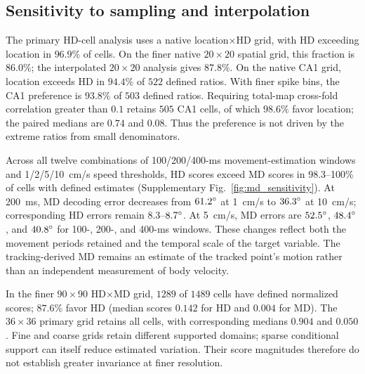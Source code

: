 \documentclass[11pt]{article}
\begin{document}
\subsection*{Sensitivity to sampling and interpolation}
The primary HD-cell analysis uses a native location$\times$HD grid, with HD exceeding location in $96.9\%$ of cells. On the finer native $20\times20$ spatial grid, this fraction is $86.0\%$; the interpolated $20\times20$ analysis gives $87.8\%$. On the native CA1 grid, location exceeds HD in $94.4\%$ of $522$ defined ratios. With finer spike bins, the CA1 preference is $93.8\%$ of $503$ defined ratios. Requiring total-map cross-fold correlation greater than $0.1$ retains $505$ CA1 cells, of which $98.6\%$ favor location; the paired medians are $0.74$ and $0.08$. Thus the preference is not driven by the extreme ratios from small denominators.

Across all twelve combinations of 100/200/400-ms movement-estimation windows and 1/2/5/10~cm/s speed thresholds, HD scores exceed MD scores in 98.3--100\% of cells with defined estimates (Supplementary Fig.~\ref{fig:md_sensitivity}). At 200~ms, MD decoding error decreases from $61.2\degree$ at 1~cm/s to $36.3\degree$ at 10~cm/s; corresponding HD errors remain $8.3$--$8.7\degree$. At 5~cm/s, MD errors are $52.5\degree$, $48.4\degree$, and $40.8\degree$ for 100-, 200-, and 400-ms windows. These changes reflect both the movement periods retained and the temporal scale of the target variable. The tracking-derived MD remains an estimate of the tracked point's motion rather than an independent measurement of body velocity.

In the finer $90\times90$ HD$\times$MD grid, $1289$ of $1489$ cells have defined normalized scores; $87.6\%$ favor HD (median scores $0.142$ for HD and $0.004$ for MD). The $36\times36$ primary grid retains all cells, with corresponding medians $0.904$ and $0.050$. Fine and coarse grids retain different supported domains; sparse conditional support can itself reduce estimated variation. Their score magnitudes therefore do not establish greater invariance at finer resolution.
\end{document}
